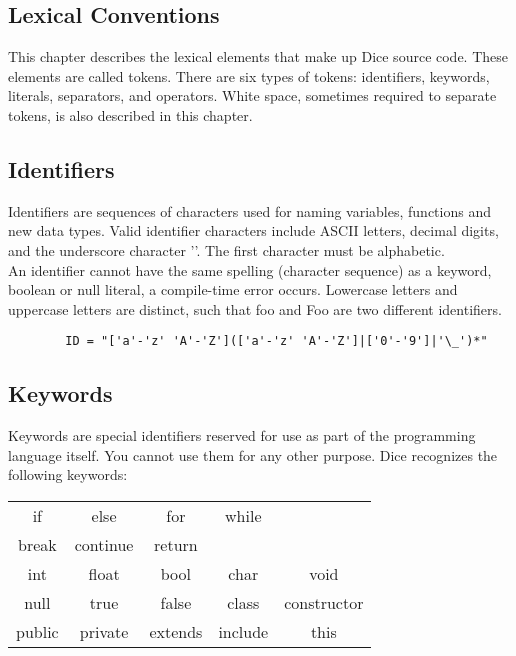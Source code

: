 \begin{homeworkProblem}
	\section{Lexical Conventions}
	This chapter describes the lexical elements that make up Dice source code. These elements are called tokens. There are six types of tokens: identifiers, keywords, literals, separators, and operators. White space, sometimes required to separate tokens, is also described in this chapter.
	
	\subsection{Identifiers}
	Identifiers are sequences of characters used for naming variables, functions and new data types. Valid identifier characters include ASCII letters, decimal digits, and the underscore character '\textunderscore'. The first character must be alphabetic.\\
	An identifier cannot have the same spelling (character sequence) as a keyword, boolean or null literal, a compile-time error occurs. Lowercase letters and uppercase letters are distinct, such that foo and Foo are two different identifiers.
	
	\begin{verbatim}
		ID = "['a'-'z' 'A'-'Z'](['a'-'z' 'A'-'Z']|['0'-'9']|'\_')*"
	\end{verbatim}
	
	\subsection{Keywords}
	Keywords are special identifiers reserved for use as part of the programming language itself. You cannot use them for any other purpose. Dice recognizes the following keywords:
	
	\begin{center}
		\begin{tabular}{ccccc}
			if & else & for & while & \\ 
			break & continue & return & & \\
			int & float & bool & char & void \\
			null & true & false & class & constructor \\
			public & private & extends & include & this \\
		\end{tabular}
	\end{center}
	

\end{homeworkProblem}
